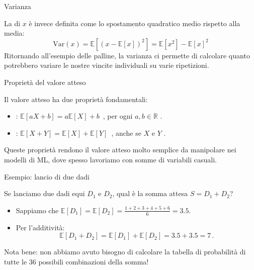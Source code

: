 \documentclass[12pt,aspectratio=169]{beamer}
\begin{document}
\begin{frame}{Varianza}

	La  di $x$ è invece definita come lo spostamento quadratico medio rispetto alla media:
	\begin{equation}
		\text{Var}(x) = \mathbb{E}\left[(x - \mathbb{E}\left[x\right])^2\right] = \mathbb{E}[x^2] - \mathbb{E}[x]^2
	\end{equation}
	Ritornando all'esempio delle palline, la varianza ci permette di calcolare quanto potrebbero variare le nostre vincite individuali su varie ripetizioni.

\end{frame}

\begin{frame}{Proprietà del valore atteso}

	Il valore atteso ha due proprietà fondamentali:
	\begin{itemize}

		\item {}: $\mathbb{E}[aX + b] = a\mathbb{E}[X] + b$ \,, per ogni $a, b \in \mathbb{R}$ .
		\item {}: $\mathbb{E}[X + Y] = \mathbb{E}[X] + \mathbb{E}[Y]$ \,, anche se $X$ e $Y$ .

	\end{itemize}

	Queste proprietà rendono il valore atteso molto semplice da manipolare nei modelli di ML, dove spesso lavoriamo con somme di variabili casuali.

\end{frame}

\begin{frame}{Esempio: lancio di due dadi}

	Se lanciamo due dadi equi $D_1$ e $D_2$, qual è la somma attesa $S = D_1 + D_2$?
	\begin{itemize}
		\item Sappiamo che $\mathbb{E}[D_1] = \mathbb{E}[D_2] = \frac{1+2+3+4+5+6}{6} = 3.5$.
		\item Per l'additività:
		      \begin{equation*}
			      \mathbb{E}[D_1 + D_2] = \mathbb{E}[D_1] + \mathbb{E}[D_2] = 3.5 + 3.5 = 7 \,.
		      \end{equation*}
	\end{itemize}

	Nota bene: non abbiamo avuto bisogno di calcolare la tabella di probabilità di tutte le 36 possibili combinazioni della somma!

\end{frame}
\end{document}
